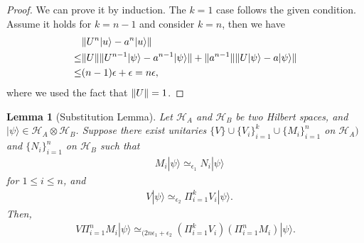 \documentclass[11pt,letterpaper]{article}
\newcommand{\ket}[1]{|#1\rangle}
\newcommand{\x}{\otimes}
\DeclarePairedDelimiter{\norm}{\lVert}{\rVert}
\newcommand{\calH}{\mathcal{H}}
\newcommand{\1}{\mathbb{1}}
\newcommand{\ep}{\epsilon}
\newcommand{\appd}[1]{\simeq_{#1}}
\newtheorem{lemma}[theorem]{Lemma}
\theoremstyle{definition}
\begin{document}
\begin{proof}
	We can prove it by induction. 
	The $k=1$ case follows the given condition.
	Assume it holds for $k = n-1$ and consider $k = n$, then we have
	\begin{align*}
		&\norm{U^n \ket{u} - a^n\ket{u}} \\
		\leq &\norm{U} \norm{U^{n-1} \ket{\psi} - a^{n-1}\ket{\psi}} + \norm{a^{n-1}}
		\norm{U\ket{\psi} - a \ket{\psi}}\\
		\leq &(n-1)\ep + \ep = n \ep,
	\end{align*}
	where we used the fact that $\norm{U} = 1$.
\end{proof}
\begin{lemma}[Substitution Lemma]
    \label{lm:sub}
    Let $\calH_A$ and $\calH_B$ be two Hilbert spaces, and
    $\ket{\psi} \in \calH_A \x \calH_B$.
    Suppose there exist unitaries 
    $\{V\} \cup \{V_i\}_{i=1}^k \cup \{ M_i \}_{i=1}^n$ on $\calH_A)$ and
    $\{ N_i \}_{i=1}^n$ on $\calH_B$ such that
    \begin{align*}
        &M_i \ket{\psi} \appd{\ep_1} N_i \ket{\psi}
    \end{align*}
    for $1 \leq i \leq n$, and 
    \begin{align*}
        &V \ket{\psi} \appd{\ep_2} \Pi_{i=1}^k V_i \ket{\psi}.
    \end{align*}
    Then,
    \begin{align*}
        V\Pi_{i=1}^n M_i \ket{\psi} 
        \appd{(2n\ep_1 + \ep_2} \left(\Pi_{i=1}^k V_i\right) 
        \left(\Pi_{i=1}^n M_i \right)\ket{\psi}.
    \end{align*}
\end{lemma}
\end{document}
